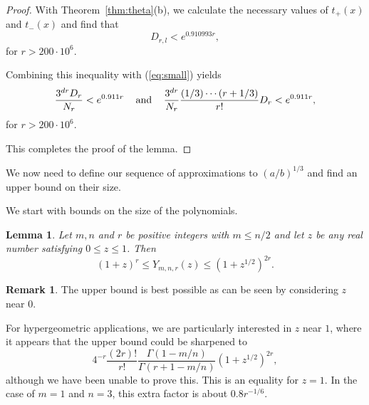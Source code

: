 \documentclass{jT}
\newtheorem{lemma}[theorem]{Lemma}
\theoremstyle{definition}
\newtheorem*{remark}{Remark}
\begin{document}
\begin{proof}
With Theorem~\ref{thm:theta}(b), we calculate the necessary 
values of $t_{+}(x)$ and $t_{-}(x)$ and find that 
\begin{displaymath}
D_{r,l} < e^{0.910993r},  
\end{displaymath}
for $r > 200 \cdot 10^{6}$.

Combining this inequality with (\ref{eq:small}) yields 
\begin{displaymath}
\frac{3^{dr} D_{r}}{N_{r}} < e^{0.911r} 
\hspace{3.0mm} \mbox{ and } \hspace{3.0mm} 
\frac{3^{dr}}{N_{r}} \frac{(1/3) \cdots (r+1/3)}{r!} D_{r} < e^{0.911r}, 
\end{displaymath}
for $r > 200 \cdot 10^{6}$. 

This completes the proof of the lemma. 
\end{proof}

We now need to define our sequence of approximations to $(a/b)^{1/3}$ and find an upper bound on their size.

We start with bounds on the size of the polynomials.

\begin{lemma} 
\label{lem:analytic-bnds}
Let $m, n$ and $r$ be positive integers with $m \leq n/2$ and let $z$ be any real number
satisfying $0 \leq z \leq 1$. Then
\begin{equation}
\label{eq:analytic-ub}
{ \left( 1 + z \right) }^{r} \leq Y_{m,n,r}(z) \leq { \left( 1 + z^{1/2} \right) }^{2r}.
\end{equation}
\end{lemma}

\begin{remark}
The upper bound is best possible as can be seen by considering $z$ near $0$.

For hypergeometric applications, we are particularly interested in $z$ near $1$, where
it appears that the upper bound could be sharpened to
\begin{displaymath}
4^{-r}\frac{(2r)!}{r!}\frac{\Gamma(1-m/n)}{\Gamma(r+1-m/n)}{ \left( 1 + z^{1/2} \right) }^{2r},
\end{displaymath}
although we have been unable to prove this. This is an equality for $z=1$. In the case of $m=1$ and $n=3$,
this extra factor is about $0.8r^{-1/6}$.
\end{remark}
\end{document}
